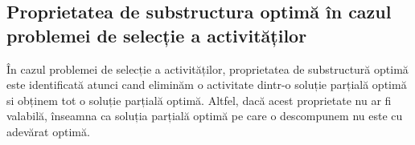 \subsection{Proprietatea de substructura optimă în cazul problemei de selecție a activităților}
În cazul problemei de selecție a activităților, proprietatea de substructură optimă este identificată atunci cand eliminăm o activitate dintr-o soluție parțială optimă si obținem tot o soluție parțială optimă. Altfel, dacă acest proprietate nu ar fi valabilă, înseamna ca soluția parțială optimă pe care o descompunem nu este cu adevărat optimă. 
